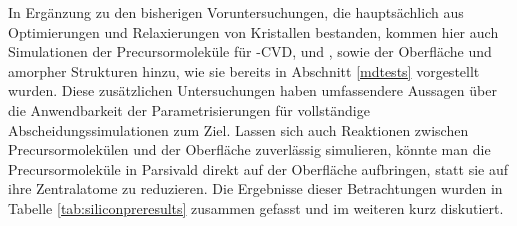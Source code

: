 In Ergänzung zu den bisherigen Voruntersuchungen, die hauptsächlich aus Optimierungen und Relaxierungen von Kristallen bestanden, kommen hier auch Simulationen der Precursormoleküle für -CVD,  und , sowie der Oberfläche und amorpher Strukturen hinzu, wie sie bereits in Abschnitt \ref{mdtests} vorgestellt wurden.
Diese zusätzlichen Untersuchungen haben umfassendere Aussagen über die Anwendbarkeit der Parametrisierungen für vollständige Abscheidungssimulationen zum Ziel.
Lassen sich auch Reaktionen zwischen Precursormolekülen und der Oberfläche zuverlässig simulieren, könnte man die Precursormoleküle in Parsivald direkt auf der Oberfläche aufbringen, statt sie auf ihre Zentralatome zu reduzieren.
Die Ergebnisse dieser Betrachtungen wurden in Tabelle \ref{tab:siliconpreresults} zusammen gefasst und im weiteren kurz diskutiert.

